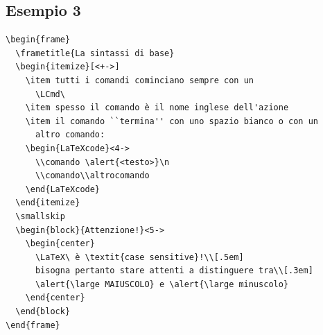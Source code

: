 \documentclass[a4paper,10pt]{article}
\begin{document}
\subsection*{Esempio 3}\label{ex3}
\begin{Verbatim}
\begin{frame}
  \frametitle{La sintassi di base}
  \begin{itemize}[<+->]
    \item tutti i comandi cominciano sempre con un
      \LCmd\
    \item spesso il comando è il nome inglese dell'azione
    \item il comando ``termina'' con uno spazio bianco o con un
      altro comando:
    \begin{LaTeXcode}<4->
      \\comando \alert{<testo>}\n
      \\comando\\altrocomando
    \end{LaTeXcode}
  \end{itemize}
  \smallskip
  \begin{block}{Attenzione!}<5->
    \begin{center}
      \LaTeX\ è \textit{case sensitive}!\\[.5em]
      bisogna pertanto stare attenti a distinguere tra\\[.3em]
      \alert{\large MAIUSCOLO} e \alert{\large minuscolo}
    \end{center}
  \end{block}
\end{frame}
\end{Verbatim}

\bigskip
\begin{center}
\end{center}
\end{document}
